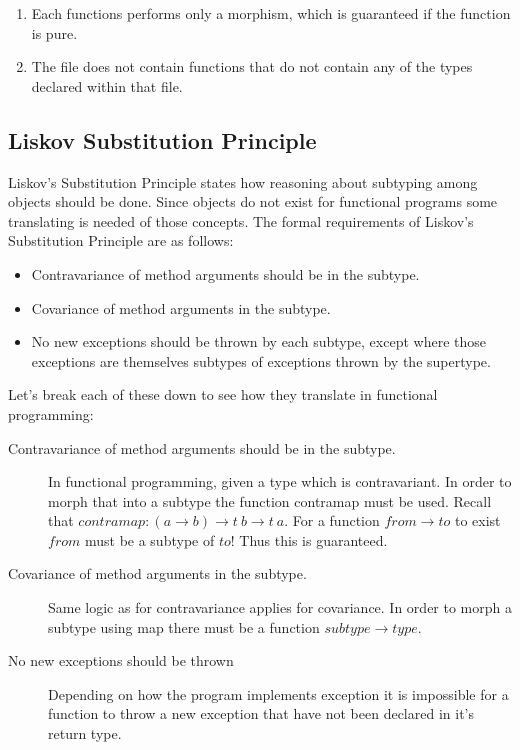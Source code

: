 \begin{enumerate}
    \item Each functions performs only a morphism, which is guaranteed if the function
        is pure.
    \item The file does not contain functions that do not contain any of the
        types declared within that file.
\end{enumerate}

\subsection{Liskov Substitution Principle}

Liskov's Substitution Principle states how reasoning about subtyping among
objects should be done. Since objects do not exist for functional programs some
translating is needed of those concepts. The formal requirements of Liskov's
Substitution Principle are as follows:

\begin{itemize}
    \item Contravariance of method arguments should be in the subtype.
    \item Covariance of method arguments in the subtype.
    \item No new exceptions should be thrown by each subtype, except where
        those exceptions are themselves subtypes of exceptions thrown by the
        supertype.
\end{itemize}

Let's break each of these down to see how they translate in functional
programming:

\begin{description}
    \item [Contravariance of method arguments should be in the subtype.] In
        functional programming, given a type which is contravariant. In order to
        morph that into a subtype the function contramap must be used. Recall
        that $contramap : (a\rightarrow b)\rightarrow t\ b\rightarrow t\ a$. For
        a function $from\rightarrow to$ to exist $from$ must be a
        subtype of $to$! Thus this is guaranteed.
    \item [Covariance of method arguments in the subtype.] Same logic as for
        contravariance applies for covariance. In order to morph a subtype using
        map there must be a function $subtype\rightarrow type$.
	\item [No new exceptions should be thrown] Depending on how the program
		implements exception it is impossible for a function to throw a new exception
		that have not been declared in it's return type.
\end{description}


